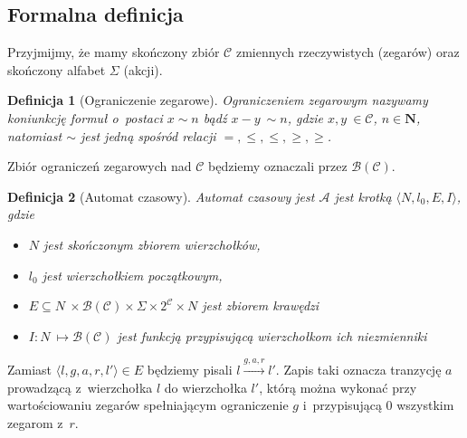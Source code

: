 \documentclass{pracamgr}
\theoremstyle{plain}
\newtheorem{definition}{Definicja}
\begin{document}
\subsection{Formalna definicja} Przyjmijmy, że mamy skończony zbiór
$\mathcal{C}$ zmiennych rzeczywistych (zegarów) oraz skończony alfabet
$\Sigma$ (akcji).

\begin{definition}[Ograniczenie zegarowe] Ograniczeniem zegarowym
nazywamy koniunkcję formuł o~postaci $x \sim n$ bądź $x - y~\sim n$,
gdzie $x, y~\in \mathcal{C}$, $n \in \mathbf{N}$, natomiast $\sim$
jest jedną spośród relacji $=, \le, \leq, \ge, \geq$.
\end{definition}
Zbiór ograniczeń zegarowych nad $\mathcal{C}$ będziemy oznaczali przez
$\mathcal{B}(\mathcal{C})$.

\begin{definition}[Automat czasowy] Automat czasowy jest $\mathcal{A}$
jest krotką $\langle N, l_0, E, I\rangle$, gdzie
  \begin{itemize}
    \item $N$ jest skończonym zbiorem wierzchołków,
    \item $l_0$ jest wierzchołkiem początkowym,
    \item $E \subseteq N~\times \mathcal{B}(\mathcal{C}) \times \Sigma
    \times 2^{\mathcal{C}} \times N$ jest zbiorem krawędzi
    \item $I: N~\mapsto \mathcal{B}(\mathcal{C})$ jest funkcją
    przypisującą wierzchołkom ich niezmienniki
  \end{itemize}
\end{definition}
Zamiast $\langle l, g, a, r, l' \rangle \in E$ będziemy pisali $l
\stackrel{g, a, r}{\longrightarrow} l'$. Zapis taki oznacza tranzycję
$a$ prowadzącą z~wierzchołka $l$ do wierzchołka $l'$, którą można
wykonać przy wartościowaniu zegarów spełniającym ograniczenie $g$
i~przypisującą $0$ wszystkim zegarom z~$r$.
\end{document}
